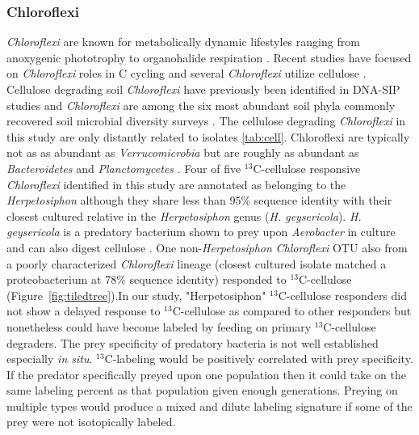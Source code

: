 \documentclass{article}
\begin{document}
\subsubsection{Chloroflexi}\label{cell:chloro}
\textit{Chloroflexi} are known for metabolically dynamic
lifestyles ranging from anoxygenic phototrophy to organohalide respiration
\citep{Hug_2013}. Recent studies have focused on \textit{Chloroflexi} roles in
C cycling \citep{Hug_2013, Goldfarb_2011,Cole_2013} and several
\textit{Chloroflexi} utilize cellulose \citep{Goldfarb_2011, Cole_2013,
Hug_2013}. Cellulose degrading soil \textit{Chloroflexi} have previously been
identified in DNA-SIP studies \citep{Schellenberger_2010} and
\textit{Chloroflexi} are among the six most abundant soil phyla commonly
recovered soil microbial diversity surveys \citep{Janssen2006}. The cellulose
degrading \textit{Chloroflexi} in this study are only distantly related to
isolates \ref{tab:cell}. Chloroflexi are typically not as as abundant as
\textit{Verrucomicrobia} but are roughly as abundant as \textit{Bacteroidetes}
and \textit{Planctomycetes} \citep{Janssen2006}. Four of five
$^{13}$C-cellulose responsive \textit{Chloroflexi} identified in this study are
annotated as belonging to the \textit{Herpetosiphon} although they share less
than 95\% sequence identity with their closest cultured relative in the
\textit{Herpetosiphon} genus (\textit{H. geysericola}). \textit{H. geysericola}
is a predatory bacterium shown to prey upon \textit{Aerobacter} in culture and
can also digest cellulose \citep{Lewin1970}. One non-\textit{Herpetosiphon}
\textit{Chloroflexi} OTU also from a poorly characterized \textit{Chloroflexi}
lineage (closest cultured isolate matched a proteobacterium at 78\% sequence
identity) responded to $^{13}$C-cellulose (Figure~\ref{fig:tiledtree}).In our
study, "Herpetosiphon" $^{13}$C-cellulose responders did not show a delayed
response to $^{13}$C-cellulose as compared to other responders but nonetheless
could have become labeled by feeding on primary $^{13}$C-cellulose degraders.
The prey specificity of predatory bacteria is not well established especially
\textit{in situ}. $^{13}$C-labeling would be positively correlated with prey
specificity. If the predator specifically preyed upon one population then it
could take on the same labeling percent as that population given enough
generations. Preying on multiple types would produce a mixed and dilute
labeling signature if some of the prey were not isotopically labeled.
\end{document}
